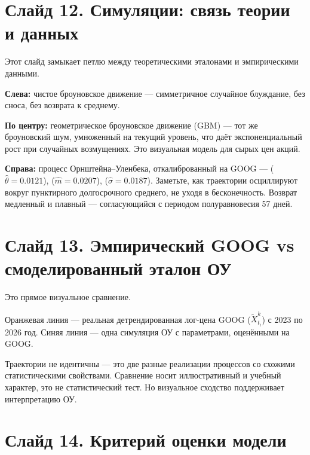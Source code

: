 \documentclass[12pt,a4paper]{article}
\begin{document}
\section{Слайд 12. Симуляции: связь теории и данных}

Этот слайд замыкает петлю между теоретическими эталонами и эмпирическими данными.

\textbf{Слева:} чистое броуновское движение --- симметричное случайное блуждание,
без сноса, без возврата к среднему.

\textbf{По центру:} геометрическое броуновское движение (GBM) ---
тот же броуновский шум, умноженный на текущий уровень,
что даёт экспоненциальный рост при случайных возмущениях.
Это визуальная модель для сырых цен акций.

\textbf{Справа:} процесс Орнштейна--Уленбека, откалиброванный на GOOG ---
($\hat\theta = 0.0121$),
($\hat m = 0.0207$),
($\hat\sigma = 0.0187$).
Заметьте, как траектории осциллируют вокруг пунктирного долгосрочного среднего,
не уходя в бесконечность.
Возврат медленный и плавный --- согласующийся с периодом полуравновесия 57 дней.

\section{Слайд 13. Эмпирический GOOG vs смоделированный эталон ОУ}

Это прямое визуальное сравнение.

Оранжевая линия --- реальная детрендированная лог-цена GOOG ($\widetilde{X}_{t_i}^k$)
с 2023 по 2026 год.
Синяя линия --- одна симуляция ОУ с параметрами, оценёнными на GOOG.

Траектории не идентичны --- это две разные реализации процессов
со схожими статистическими свойствами.
Сравнение носит иллюстративный и учебный характер, это не статистический тест.
Но визуальное сходство поддерживает интерпретацию ОУ.

\section{Слайд 14. Критерий оценки модели}
\end{document}
